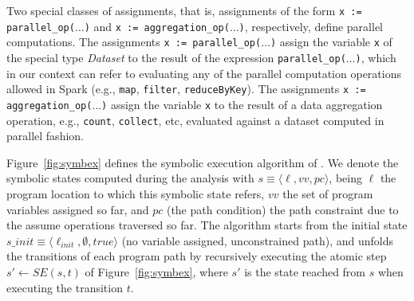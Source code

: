 Two special classes of assignments, that is, assignments of the form \texttt{x := parallel\_op($\dots$)} and \texttt{x~:= aggregation\_op($\dots$)}, respectively, define parallel computations. 
The assignments \texttt{x := parallel\_op($\dots$)} assign the variable \texttt{x}
of the special type \emph{Dataset} to the result of the
expression \texttt{parallel\_op($\dots$)}, which in our context can refer to evaluating any of the parallel computation operations allowed in Spark (e.g., \texttt{map}, \texttt{filter}, \texttt{reduceByKey}).
The assignments \texttt{x~:= aggregation\_op($\dots$)} assign the variable \texttt{x}
to the result of a data aggregation operation, e.g., \texttt{count}, \texttt{collect}, etc, evaluated against a dataset computed in parallel fashion. 

Figure~\ref{fig:symbex} defines the symbolic execution algorithm of \approach. We denote the symbolic states computed during the analysis with $s \equiv \langle \ell, vv, pc\rangle$, being $\ell$ the program location to which this symbolic state refers, $vv$ the set of program variables assigned so far, and $pc$ (the path condition) the path constraint due to the assume operations traversed so far. The algorithm starts from the initial state $s\_{init} \equiv \langle \ell_{init}, \emptyset, true\rangle$ (no variable assigned, unconstrained path), and unfolds the transitions of each program path by recursively executing the atomic step $s'\gets SE(s, t)$ of Figure~\ref{fig:symbex}, where $s'$ is the state reached from $s$ when executing the transition $t$. 


